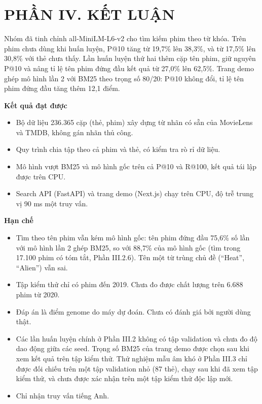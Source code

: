 \documentclass[12pt,a4paper]{article}
\providecommand{\tightlist}{\setlength{\itemsep}{0pt}\setlength{\parskip}{0pt}}
\newcommand{\lbl}[1]{\Needspace{6\baselineskip}\textbf{#1}\par\nopagebreak}
\newcommand{\chap}[1]{\clearpage\section{#1}}
\begin{document}
\chap{PHẦN IV. KẾT LUẬN}

Nhóm đã tinh chỉnh all-MiniLM-L6-v2 cho tìm kiếm phim theo từ khóa. Trên phim chưa dùng khi huấn luyện, P@10 tăng từ 19,7\% lên 38,3\%, và từ 17,5\% lên 30,8\% với thẻ chưa thấy. Lần huấn luyện thứ hai thêm cặp tên phim, giữ nguyên P@10 và nâng tỉ lệ tên phim đứng đầu kết quả từ 27,0\% lên 62,5\%. Trang demo ghép mô hình lần 2 với BM25 theo trọng số 80/20: P@10 không đổi, tỉ lệ tên phim đứng đầu tăng thêm 12,1 điểm.

\lbl{Kết quả đạt được}

\begin{itemize}
\tightlist
\item Bộ dữ liệu 236.365 cặp (thẻ, phim) xây dựng từ nhãn có sẵn của MovieLens và TMDB, không gán nhãn thủ công.
\item Quy trình chia tập theo cả phim và thẻ, có kiểm tra rò rỉ dữ liệu.
\item Mô hình vượt BM25 và mô hình gốc trên cả P@10 và R@100, kết quả tái lập được trên CPU.
\item Search API (FastAPI) và trang demo (Next.js) chạy trên CPU, độ trễ trung vị 90 ms một truy vấn.
\end{itemize}

\lbl{Hạn chế}

\begin{itemize}
\tightlist
\item Tìm theo tên phim vẫn kém mô hình gốc: tên phim đứng đầu 75,6\% số lần với mô hình lần 2 ghép BM25, so với 88,7\% của mô hình gốc (tìm trong 17.100 phim có tóm tắt, Phần III.2.6). Tên một từ trùng chủ đề (``Heat'', ``Alien'') vẫn sai.
\item Tập kiểm thử chỉ có phim đến 2019. Chưa đo được chất lượng trên 6.688 phim từ 2020.
\item Đáp án là điểm genome do máy dự đoán. Chưa có đánh giá bởi người dùng thật.
\item Các lần huấn luyện chính ở Phần III.2 không có tập validation và chưa đo độ dao động giữa các seed. Trọng số BM25 của trang demo được chọn sau khi xem kết quả trên tập kiểm thử. Thử nghiệm mẫu âm khó ở Phần III.3 chỉ được đối chiếu trên một tập validation nhỏ (87 thẻ), chạy sau khi đã xem tập kiểm thử, và chưa được xác nhận trên một tập kiểm thử độc lập mới.
\item Chỉ nhận truy vấn tiếng Anh.
\end{itemize}
\end{document}
